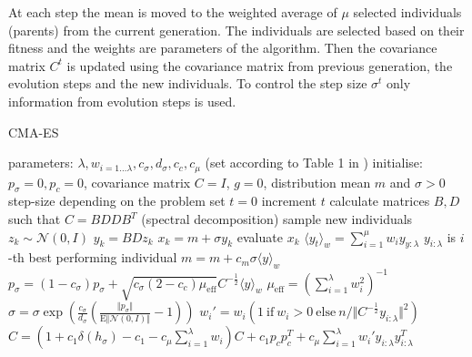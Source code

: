 At each step the mean is moved to the weighted average of $\mu$ selected individuals (parents) from the current generation. The individuals are selected based on their fitness and the weights are parameters of the algorithm. Then the covariance matrix $C^t$ is updated using the covariance matrix from previous generation, the evolution steps and the new individuals. To control the step size $\sigma^t$ only information from evolution steps is used.\cite{hansen2016cma}

\begin{algorithm}[h]
    \begin{algorithmic}[1]
    \caption{CMA-ES}
    \label{alg:cma-es}
        \State parameters: $\lambda, w_{i=1\dots\lambda}, c_\sigma,d_\sigma, c_c, c_\mu$ (set according to Table 1 in \cite{hansen2016cma})
        \State initialise: $p_\sigma=0,p_c=0$, covariance matrix $C=I$, $g=0$, distribution mean $m$ and $\sigma > 0$ step-size depending on the problem
        \State set $t=0$
        \Repeat
            \State increment $t$
            \State calculate matrices $B,D$ such that $C=BDDB^T$ (spectral decomposition)
            \Comment sample new individuals
                \State $z_k \sim \mathcal{N}(0,I)$
                \State $y_k = BDz_k$
                \State $x_k = m+\sigma y_k$
                \State evaluate $x_k$
            \EndFor
            \State $\langle y_t\rangle_w = \sum_{i=1}^\mu w_i y_{y:\lambda} $ \Comment $y_{i:\lambda}$ is $i$-th best performing individual
            \State $m = m+c_m \sigma \langle y\rangle_w$
            \State $p_\sigma = (1-c_\sigma)p_\sigma + \sqrt{c_\sigma (2-c_c)\mu_{\text{eff}}}C^{-\frac{1}{2}}\langle y \rangle_w$ \Comment $\mu_{\text{eff}}=(\sum_{i=1}^\lambda w_i^2)^{-1}$
            \State $\sigma = \sigma \exp(\frac{c_\sigma}{d_\sigma}(\frac{\Vert p_\sigma\Vert}{\mathrm{E}\Vert\mathcal{N}(0,I)\Vert}-1))$
            \State $w_i' = w_i(1\ \text{if}\ w_i> 0\ \text{else}\ n/ \Vert C^{-\frac{1}{2}}y_{i:\lambda}\Vert^2)$
            \State $C = (1+c_1\delta(h_\sigma)-c_1-c_\mu\sum_{i=1}^\lambda w_i)C + c_1p_cp_c^T + c_\mu\sum_{i=1}^\lambda w_i'y_{i:\lambda}y_{i:\lambda}^T$
    \end{algorithmic}
    \end{algorithm}

